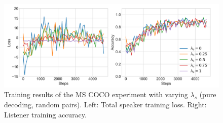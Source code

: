 \begin{figure}[h]
	\centering
	\includegraphics[width=\linewidth]{images/coco_refgame_4000_pure_all_Ls_random.png}
	\caption{Training results of the MS COCO experiment with varying $\lambda_s$ (pure decoding, random pairs). Left: Total speaker training loss. Right: Listener training accuracy.}
	\label{fig:coco_baseline_speaker_loss_listener_acc_all}
\end{figure}


